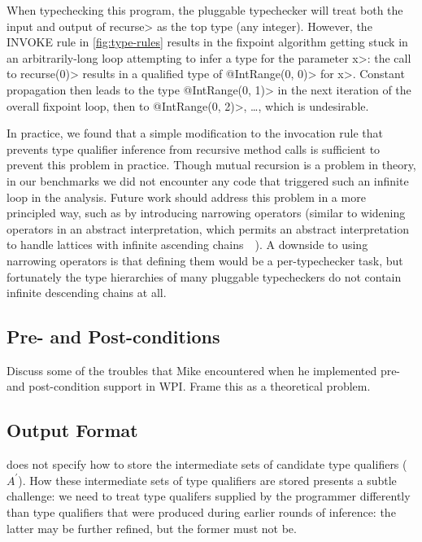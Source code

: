 When typechecking this program, the pluggable typechecker will
treat both the input and output of \<recurse> as the top type
(\ie any integer). However, the \textsc{INVOKE} rule in \cref{fig:type-rules}
results in the fixpoint algorithm getting stuck in an arbitrarily-long
loop attempting to infer a type for the parameter \<x>: the call to \<recurse(0)>
results in a qualified type of \<@IntRange(0, 0)> for \<x>. Constant
propagation then leads to the type \<@IntRange(0, 1)> in the next iteration
of the overall fixpoint loop, then to \<@IntRange(0, 2)>, \ldots, which
is undesirable.

In practice, we found that a simple modification to the invocation rule that
prevents type qualifier inference from recursive method calls is sufficient
to prevent this problem in practice.
%
Though mutual recursion is a problem in
theory, in our benchmarks we did not encounter any code that triggered such
an infinite loop in the analysis.
%
Future work should address this problem in
a more principled way, such as by introducing narrowing operators
(similar to widening operators in an abstract interpretation, which
permits an abstract interpretation to handle lattices with infinite
ascending chains~\cite{CousotC77:AI}~).
A downside to using narrowing operators is that defining them would
be a per-typechecker task, but fortunately the type hierarchies of many
pluggable typecheckers do not contain infinite descending chains at all.

\subsection{Pre- and Post-conditions}
\label{sec:pre-post-conditions}

Discuss some of the troubles that Mike encountered when
he implemented pre- and post-condition support in WPI\@. Frame
this as a theoretical problem. 

\subsection{Output Format}
\label{sec:output}

 does not specify how to store the intermediate
sets of candidate type qualifiers (\ie $A^{\prime}$). How these intermediate
sets of type qualifiers are stored presents a subtle challenge: we need
to treat type qualifers supplied by the programmer differently than
type qualifiers that were produced during earlier rounds of inference:
the latter may be further refined, but the former must not be.

